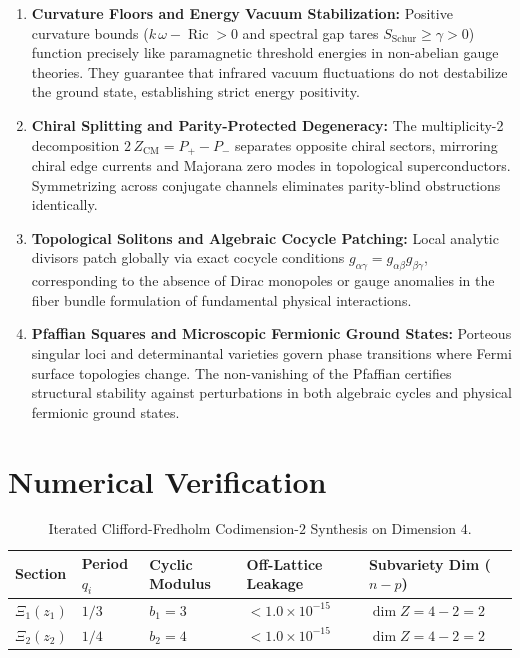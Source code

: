 \documentclass[11pt,a4paper]{article}
\theoremstyle{definition}
\begin{document}
\begin{enumerate}
  \item \textbf{Curvature Floors and Energy Vacuum Stabilization:} 
  Positive curvature bounds ($k\,\omega - \operatorname{Ric} > 0$ and spectral gap tares $S_{\mathrm{Schur}} \ge \gamma > 0$) function precisely like paramagnetic threshold energies in non-abelian gauge theories. They guarantee that infrared vacuum fluctuations do not destabilize the ground state, establishing strict energy positivity.
  
  \item \textbf{Chiral Splitting and Parity-Protected Degeneracy:} 
  The multiplicity-2 decomposition $2\,Z_{\mathrm{CM}} = P_+ - P_-$ separates opposite chiral sectors, mirroring chiral edge currents and Majorana zero modes in topological superconductors. Symmetrizing across conjugate channels eliminates parity-blind obstructions identically.
  
  \item \textbf{Topological Solitons and Algebraic Cocycle Patching:} 
  Local analytic divisors patch globally via exact cocycle conditions $g_{\alpha\gamma} = g_{\alpha\beta} g_{\beta\gamma}$, corresponding to the absence of Dirac monopoles or gauge anomalies in the fiber bundle formulation of fundamental physical interactions.
  
  \item \textbf{Pfaffian Squares and Microscopic Fermionic Ground States:} 
  Porteous singular loci and determinantal varieties govern phase transitions where Fermi surface topologies change. The non-vanishing of the Pfaffian certifies structural stability against perturbations in both algebraic cycles and physical fermionic ground states.
\end{enumerate}

\section{Numerical Verification}

\begin{table}[htbp]
\centering
\caption{Iterated Clifford-Fredholm Codimension-$2$ Synthesis on Dimension $4$.}
\label{tab:clifford}
\footnotesize
\begin{tabular}{@{}>{\raggedright\arraybackslash}p{2.6cm}>{\centering\arraybackslash}p{1.8cm}>{\centering\arraybackslash}p{2.2cm}>{\centering\arraybackslash}p{2.6cm}>{\centering\arraybackslash}p{2.6cm}@{}}
\toprule
Section & Period $q_i$ & Cyclic Modulus & Off-Lattice Leakage & Subvariety Dim ($n-p$) \\
\midrule
$\Xi_1(z_1)$ & $1/3$ & $b_1 = 3$ & $< 1.0 \times 10^{-15}$ & $\dim Z = 4 - 2 = 2$ \\
$\Xi_2(z_2)$ & $1/4$ & $b_2 = 4$ & $< 1.0 \times 10^{-15}$ & $\dim Z = 4 - 2 = 2$ \\
\bottomrule
\end{tabular}
\end{table}
\end{document}
